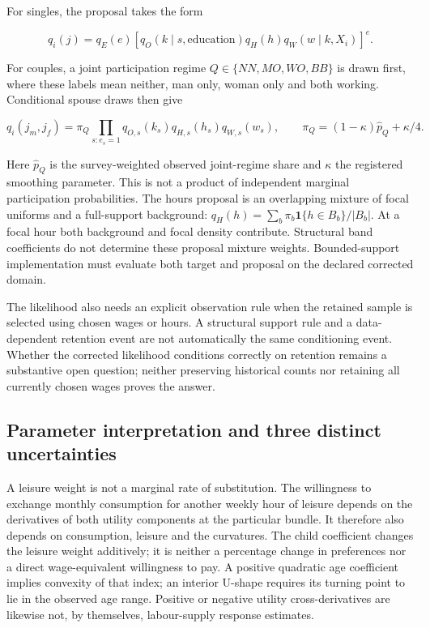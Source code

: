 \documentclass[11pt,a4paper]{article}
\begin{document}
For singles, the proposal takes the form

\[q_i(j)=q_E(e)\left[q_O(k\mid s,\text{education})q_H(h)q_W(w\mid k,X_i)\right]^e.\]

For couples, a joint participation regime \(Q\in\{NN,MO,WO,BB\}\) is drawn first, where these labels mean neither, man only, woman only and both working. Conditional spouse draws then give

\[q_i(j_m,j_f)=\pi_Q\prod_{s:e_s=1}q_{O,s}(k_s)q_{H,s}(h_s)q_{W,s}(w_s),\qquad
\pi_Q=(1-\kappa)\widehat p_Q+\kappa/4.\]

Here \(\widehat p_Q\) is the survey-weighted observed joint-regime share and \(\kappa\) the registered smoothing parameter. This is not a product of independent marginal participation probabilities. The hours proposal is an overlapping mixture of focal uniforms and a full-support background: \(q_H(h)=\sum_b\pi_b\mathbf1\{h\in B_b\}/|B_b|\). At a focal hour both background and focal density contribute. Structural band coefficients do not determine these proposal mixture weights. Bounded-support implementation must evaluate both target and proposal on the declared corrected domain.

The likelihood also needs an explicit observation rule when the retained sample is selected using chosen wages or hours. A structural support rule and a data-dependent retention event are not automatically the same conditioning event. Whether the corrected likelihood conditions correctly on retention remains a substantive open question; neither preserving historical counts nor retaining all currently chosen wages proves the answer.

\subsection{Parameter interpretation and three distinct uncertainties}\label{parameter-interpretation-and-three-distinct-uncertainties}

A leisure weight is not a marginal rate of substitution. The willingness to exchange monthly consumption for another weekly hour of leisure depends on the derivatives of both utility components at the particular bundle. It therefore also depends on consumption, leisure and the curvatures. The child coefficient changes the leisure weight additively; it is neither a percentage change in preferences nor a direct wage-equivalent willingness to pay. A positive quadratic age coefficient implies convexity of that index; an interior U-shape requires its turning point to lie in the observed age range. Positive or negative utility cross-derivatives are likewise not, by themselves, labour-supply response estimates.
\end{document}
